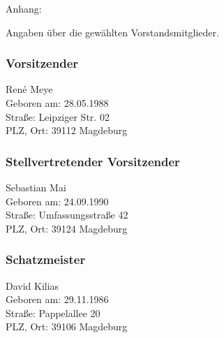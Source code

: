Anhang:

Angaben über die gewählten Vorstandsmitglieder.

\subsubsection*{Vorsitzender}
René Meye\\
Geboren am: 28.05.1988\\
Straße: Leipziger Str. 02\\
PLZ, Ort: 39112 Magdeburg\\

\subsubsection*{Stellvertretender Vorsitzender}
Sebastian Mai\\
Geboren am: 24.09.1990\\
Straße: Umfassungsstraße 42\\
PLZ, Ort: 39124 Magdeburg\\

\subsubsection*{Schatzmeister}
David Kilias\\
Geboren am: 29.11.1986\\
Straße: Pappelallee 20\\
PLZ, Ort: 39106 Magdeburg\\
